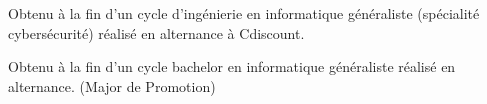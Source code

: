 \documentclass[10pt,a4paper,ragged2e,withhyper]{altacv}
\begin{document}
\begin{paracol}{2}
  \divider

  Obtenu à la fin d'un cycle d'ingénierie en informatique généraliste (spécialité
  cybersécurité) réalisé en alternance à Cdiscount.

  \divider

  Obtenu à la fin d'un cycle bachelor en informatique généraliste réalisé en
  alternance.
  (Major de Promotion)

  \divider



\end{paracol}
\end{document}
